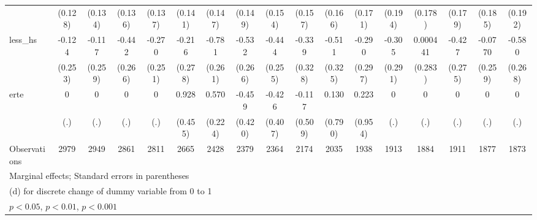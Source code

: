 {\begin{tabular}{l*{16}{c}}
                    &     (0.128)         &     (0.134)         &     (0.136)         &     (0.137)         &     (0.141)         &     (0.147)         &     (0.149)         &     (0.154)         &     (0.157)         &     (0.166)         &     (0.171)         &     (0.194)         &     (0.178)         &     (0.179)         &     (0.185)         &     (0.192)         \\
[1em]
less\_hs             &      -0.124         &      -0.117         &      -0.442         &      -0.270         &      -0.216         &      -0.781\sym{**} &      -0.532\sym{*}  &      -0.444         &      -0.339         &      -0.511         &      -0.290         &      -0.305         &    0.000441         &      -0.427         &     -0.0770         &      -0.580\sym{*}  \\
                    &     (0.253)         &     (0.259)         &     (0.266)         &     (0.251)         &     (0.278)         &     (0.261)         &     (0.266)         &     (0.255)         &     (0.328)         &     (0.325)         &     (0.297)         &     (0.291)         &     (0.283)         &     (0.275)         &     (0.259)         &     (0.268)         \\
[1em]
erte                &           0         &           0         &           0         &           0         &       0.928\sym{*}  &       0.570\sym{*}  &      -0.459         &      -0.426         &      -0.117         &       0.130         &       0.223         &           0         &           0         &           0         &           0         &           0         \\
                    &         (.)         &         (.)         &         (.)         &         (.)         &     (0.455)         &     (0.224)         &     (0.420)         &     (0.407)         &     (0.509)         &     (0.790)         &     (0.954)         &         (.)         &         (.)         &         (.)         &         (.)         &         (.)         \\
\hline
Observations        &        2979         &        2949         &        2861         &        2811         &        2665         &        2428         &        2379         &        2364         &        2174         &        2035         &        1938         &        1913         &        1884         &        1911         &        1877         &        1873         \\
\hline\hline
\multicolumn{17}{l}{\footnotesize Marginal effects; Standard errors in parentheses}\\
\multicolumn{17}{l}{\footnotesize  (d) for discrete change of dummy variable from 0 to 1}\\
\multicolumn{17}{l}{\footnotesize \sym{*} \(p<0.05\), \sym{**} \(p<0.01\), \sym{***} \(p<0.001\)}\\
\end{tabular}
}
